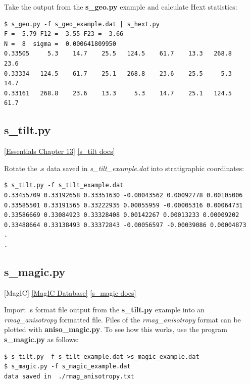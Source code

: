 \documentclass[11pt]{book}
\begin{document}
{{{Take the output from the {\bf s\_geo.py} example and calculate Hext statistics:

\begin{verbatim}
$ s_geo.py -f s_geo_example.dat | s_hext.py
F =  5.79 F12 =  3.55 F23 =  3.66
N =  8  sigma =  0.000641809950
0.33505     5.3    14.7    25.5   124.5    61.7    13.3   268.8    23.6
0.33334   124.5    61.7    25.1   268.8    23.6    25.5     5.3    14.7
0.33161   268.8    23.6    13.3     5.3    14.7    25.1   124.5    61.7

\end{verbatim}


\subsection{s\_tilt.py}
\href{http://earthref.org/MAGIC/books/Tauxe/Essentials/WebBook3ch13.html#ch13}{[Essentials Chapter 13]}
\href{https://github.com/PmagPy/PmagPy/blob/master/programs/s_tilt.py}{[s\_tilt docs]}

Rotate the .s data saved in {\it s\_tilt\_example.dat} into stratigraphic coordinates:

\begin{verbatim}
$ s_tilt.py -f s_tilt_example.dat
0.33455709 0.33192658 0.33351630 -0.00043562 0.00092778 0.00105006
0.33585501 0.33191565 0.33222935 0.00055959 -0.00005316 0.00064731
0.33586669 0.33084923 0.33328408 0.00142267 0.00013233 0.00009202
0.33488664 0.33138493 0.33372843 -0.00056597 -0.00039086 0.00004873
.
.
\end{verbatim}


\subsection{s\_magic.py} [MagIC]
\href{#MagICDatabase}{[MagIC Database]}
\href{https://github.com/PmagPy/PmagPy/blob/master/programs/s_magic.py}{[s\_magic docs]}

Import .s format file output from the {\bf s\_tilt.py} example into an {\it rmag\_anisotropy} formatted file.  Files of the {\it rmag\_anisotropy} format can be plotted  with {\bf aniso\_magic.py}.   To see how this works,  use the program {\bf s\_magic.py} as follows:

\begin{verbatim}
$ s_tilt.py -f s_tilt_example.dat >s_magic_example.dat
$ s_magic.py -f s_magic_example.dat
data saved in  ./rmag_anisotropy.txt
\end{verbatim}

}}}
\end{document}
